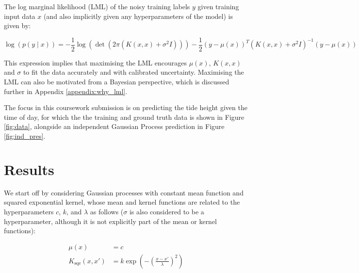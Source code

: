 \documentclass{article}
\begin{document}
The log marginal likelihood (LML) of the noisy training labels $y$ given training input data $x$ (and also implicitly given any hyperparameters of the model) is given by:


\begin{equation}
    \log \left( p(y \mid x) \right) = -\frac{1}{2}\log\left(\det \left(2\pi\left( K(x, x) + \sigma^2 I \right)\right)\right) -\frac{1}{2}(y - \mu(x))^T \left( K(x, x) + \sigma^2 I \right)^{-1} (y - \mu(x))
\end{equation}

This expression implies that maximising the LML encourages $\mu(x)$, $K(x,x)$ and $\sigma$ to fit the data accurately and with calibrated uncertainty. Maximising the LML can also be motivated from a Bayesian perspective, which is discussed further in Appendix \ref{appendix:why_lml}.

The focus in this coursework submission is on predicting the tide height given the time of day, for which the the training and ground truth data is shown in Figure \ref{fig:data}, alongside an independent Gaussian Process prediction in Figure \ref{fig:ind_pres}.


\section{Results}

We start off by considering Gaussian processes with constant mean function and squared exponential kernel, whose mean and kernel functions are related to the hyperparameters $c$, $k$, and $\lambda$ as follows ($\sigma$ is also considered to be a hyperparameter, although it is not explicitly part of the mean or kernel functions):


\begin{align}
\mu(x) &= c \\
K_{\mathrm{sqe}}(x, x') &= k \exp\left( -\left( \frac{x - x'}{\lambda} \right)^2 \right)
\end{align}
\end{document}
